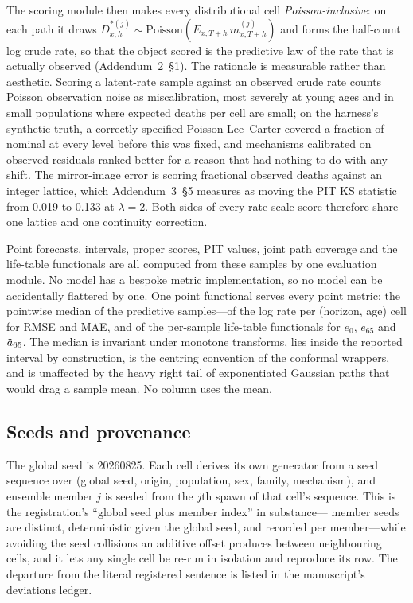 The scoring module then makes every distributional cell
\emph{Poisson-inclusive}: on each path it draws
$D^{\ast(j)}_{x,h}\sim\mathrm{Poisson}(E_{x,T+h}\,m^{(j)}_{x,T+h})$ and forms
the half-count log crude rate, so that the object scored is the predictive law
of the rate that is actually observed (Addendum~2~\S1). The rationale is
measurable rather than aesthetic. Scoring a latent-rate sample against an
observed crude rate counts Poisson observation noise as miscalibration, most
severely at young ages and in small populations where expected deaths per cell
are small; on the harness's synthetic truth, a correctly specified Poisson
Lee--Carter covered a fraction of nominal at every level before this was
fixed, and mechanisms calibrated on observed residuals ranked better for a
reason that had nothing to do with any shift. The mirror-image error is
scoring fractional observed deaths against an integer lattice, which
Addendum~3~\S5 measures as moving the PIT KS statistic from 0.019 to 0.133 at
$\lambda=2$. Both sides of every rate-scale score therefore share one lattice
and one continuity correction.

Point forecasts, intervals, proper scores, PIT values, joint path coverage and
the life-table functionals are all computed from these samples by one
evaluation module. No model has a bespoke metric implementation, so no model
can be accidentally flattered by one. One point functional serves every point
metric: the pointwise median of the predictive samples---of the log rate per
(horizon, age) cell for RMSE and MAE, and of the per-sample life-table
functionals for $e_0$, $e_{65}$ and $\ddot{a}_{65}$. The median is invariant under
monotone transforms, lies inside the reported interval by construction, is the
centring convention of the conformal wrappers, and is unaffected by the heavy
right tail of exponentiated Gaussian paths that would drag a sample mean. No
column uses the mean.

\subsection{Seeds and provenance}
\label{supp:methods-seeds}

The global seed is 20260825. Each cell derives its own generator from a seed
sequence over (global seed, origin, population, sex, family, mechanism), and
ensemble member $j$ is seeded from the $j$th spawn of that cell's sequence.
This is the registration's ``global seed plus member index'' in substance---
member seeds are distinct, deterministic given the global seed, and recorded
per member---while avoiding the seed collisions an additive offset produces
between neighbouring cells, and it lets any single cell be re-run in isolation
and reproduce its row. The departure from the literal registered sentence is
listed in the manuscript's deviations ledger.

